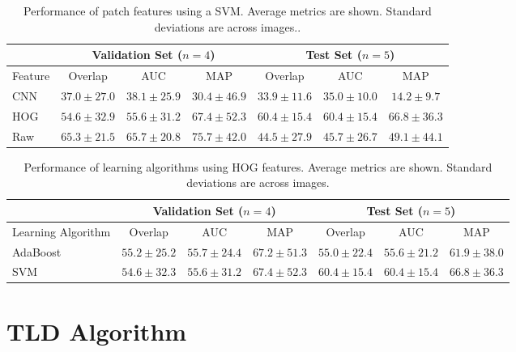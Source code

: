 \documentclass[10pt,twocolumn,letterpaper]{article}
\begin{document}
\begin{table}[t]
\vspace{-8mm}
	\centering
	\caption{Performance of patch features using a SVM.  Average metrics are shown. Standard deviations are across images..}
	\small
	\begin{tabular}{|l|ccc|ccc|}
		\hline
		& \multicolumn{3}{c|}{Validation Set ($n=4$)} & \multicolumn{3}{c|}{Test Set ($n=5$)} \\ \hline
		Feature &  Overlap &  AUC & MAP & Overlap &  AUC &  MAP \\ \hline
		CNN &  $ 37.0 \pm 27.0 $  &  $ 38.1 \pm 25.9 $  &  $ 30.4 \pm 46.9 $  &  $ 33.9 \pm 11.6 $  &  $ 35.0 \pm 10.0 $  &  $ 14.2 \pm 9.7 $  \\
		HOG &  $ 54.6 \pm 32.9 $  &  $ 55.6 \pm 31.2 $  &  $ 67.4 \pm 52.3 $  &  $ 60.4 \pm 15.4 $  &  $ 60.4 \pm 15.4 $  &  $ 66.8 \pm 36.3 $  \\
		Raw &  $ 65.3 \pm 21.5 $  &  $ 65.7 \pm 20.8 $  &  $ 75.7 \pm 42.0 $  &  $ 44.5 \pm 27.9 $  &  $ 45.7 \pm 26.7 $  &  $ 49.1 \pm 44.1 $  \\
		\hline
	\end{tabular}
	\label{table:feature_performance}
\end{table}

\begin{table}[t]
	\centering
	\caption{Performance of learning algorithms using HOG features. Average metrics are shown. Standard deviations are across images.}
	\small
	\begin{tabular}{|l|ccc|ccc|}
		\hline
		& \multicolumn{3}{c|}{Validation Set ($n=4$)} & \multicolumn{3}{c|}{Test Set ($n=5$)} \\ \hline
		Learning Algorithm &  Overlap &  AUC & MAP & Overlap &  AUC &  MAP \\ \hline
		AdaBoost &  $ 55.2 \pm 25.2 $  &  $ 55.7 \pm 24.4 $  &  $ 67.2 \pm 51.3 $  &  $ 55.0 \pm 22.4 $  &  $ 55.6 \pm 21.2 $  &  $ 61.9 \pm 38.0 $  \\
		SVM		 &  $ 54.6 \pm 32.3 $  &  $ 55.6 \pm 31.2 $  &  $ 67.4 \pm 52.3 $  &  $ 60.4 \pm 15.4 $  &  $ 60.4 \pm 15.4 $  &  $ 66.8 \pm 36.3 $  \\
		\hline
	\end{tabular}
	\label{table:learner_performance}
\end{table}

\section{TLD Algorithm}\label{sec:tld}
\end{document}

